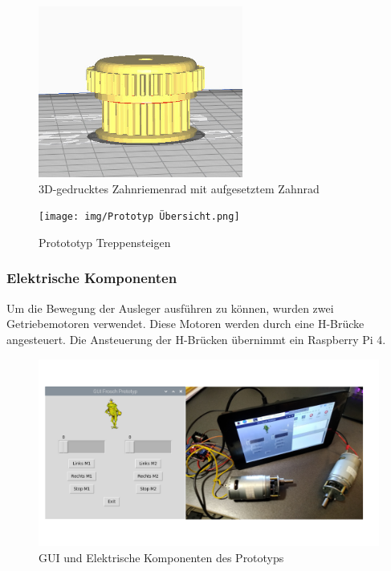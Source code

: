 \begin{figure}[H]
  \includegraphics[width=0.6\textwidth]{img/Zahnrad gedruckt.JPG}
  \centering
  \caption{3D-gedrucktes Zahnriemenrad mit aufgesetztem Zahnrad}
  \label{fig:3d-gedrucktes-zahnriemenrad}
\end{figure}

\begin{figure}[H]
  \texttt{[image: img/Prototyp Übersicht.png]}
  \centering
  \caption{Protototyp Treppensteigen}
  \label{fig:prototyp-treppensteigen}
\end{figure}

\subsubsection{Elektrische Komponenten}
Um die Bewegung der Ausleger ausführen zu können, wurden zwei Getriebemotoren verwendet. Diese Motoren werden durch eine H-Brücke angesteuert. Die Ansteuerung der H-Brücken übernimmt ein Raspberry Pi 4.

\begin{figure}[H]
  \includegraphics[width=\textwidth]{img/Funktionsmuster Treppensteigen/GUI.png}
  \centering
  \caption{GUI und Elektrische Komponenten des Prototyps}
  \label{fig:gui-prototyp}
\end{figure}

